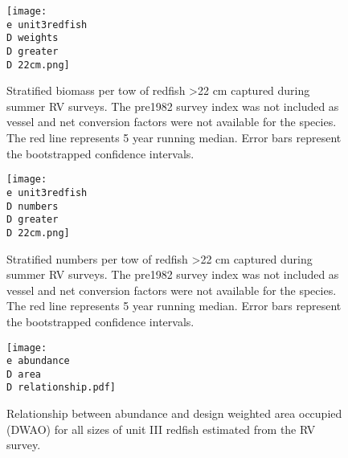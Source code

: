 \documentclass[11pt]{article}
\newcommand{\D}{.}
\newcommand{\e}{/home/ecomod_data/redfish/figures/}
\begin{document}
\begin{figure}
\centering
    
    \texttt{[image: \\e unit3redfish\\D weights\\D greater\\D 22cm.png]}
    \caption{Stratified biomass per tow of redfish \textgreater 22 cm captured during summer RV surveys. The pre1982 survey index was not included as vessel and net conversion factors were not available for the species. The red line represents 5 year running median. Error bars represent the bootstrapped confidence intervals.}

\end{figure}
%
%
\begin{figure}
\centering
    
    \texttt{[image: \\e unit3redfish\\D numbers\\D greater\\D 22cm.png]}
    \caption{Stratified numbers per tow of redfish \textgreater 22 cm  captured during summer RV surveys. The pre1982 survey index was not included as vessel and net conversion factors were not available for the species. The red line represents 5 year running median. Error bars represent the bootstrapped confidence intervals.}

\end{figure}
\clearpage

\begin{figure}
  \texttt{[image: \\e abundance\\D area\\D relationship.pdf]}
    \caption{Relationship between abundance and design weighted area occupied (DWAO) for all sizes of unit III redfish estimated from the RV survey.}

\end{figure}
\end{document}
